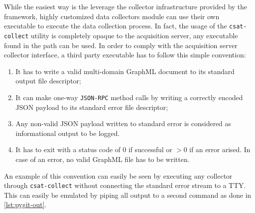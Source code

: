 While the easiest way is the leverage the collector infrastructure provided by the framework, highly customized data collectors module can use their own executable to execute the data collection process. In fact, the usage of the \texttt{csat-collect} utility is completely opaque to the acquisition server, any executable found in the path can be used. In order to comply with the acquisition server collector interface, a third party executable has to follow this simple convention:

\begin{enumerate}
  \item It has to write a valid multi-domain GraphML document to its standard output file descriptor;
  \item It can make one-way \texttt{JSON-RPC} method calls by writing a correctly encoded JSON payload to its standard error file descriptor;
  \item Any non-valid JSON payload written to standard error is considered as informational output to be logged.
  \item It has to exit with a status code of $0$ if successful or $>0$ if an error arised. In case of an error, no valid GraphML file has to be written.
\end{enumerate}

An example of this convention can easily be seen by executing any collector through \texttt{csat-collect} without connecting the standard error stream to a TTY. This can easily be emulated by piping all output to a second command as done in \vref{lst:pygit-out}.

